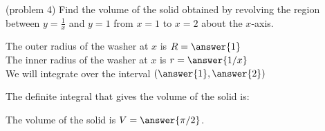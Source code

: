 \documentclass[handout]{ximera}
\begin{document}
\begin{problem}(problem 4)
Find the volume of the solid obtained by revolving the region between $y= \frac{1}{x}$ and $y = 1$ from $x = 1$ to $x = 2$ about the $x$-axis.


The outer radius of the washer at $x$ is $R = \answer{1}$\\
The inner radius of the washer at $x$ is $r = \answer{1/x}$\\

We will integrate over the interval $\left(\answer{1},\answer{2}\right)$

The definite integral that gives the volume of the solid is:\\
\begin{multipleChoice}
\end{multipleChoice}

The volume of the solid is $V = \answer{\pi/2 }$.

\end{problem}
\end{document}

